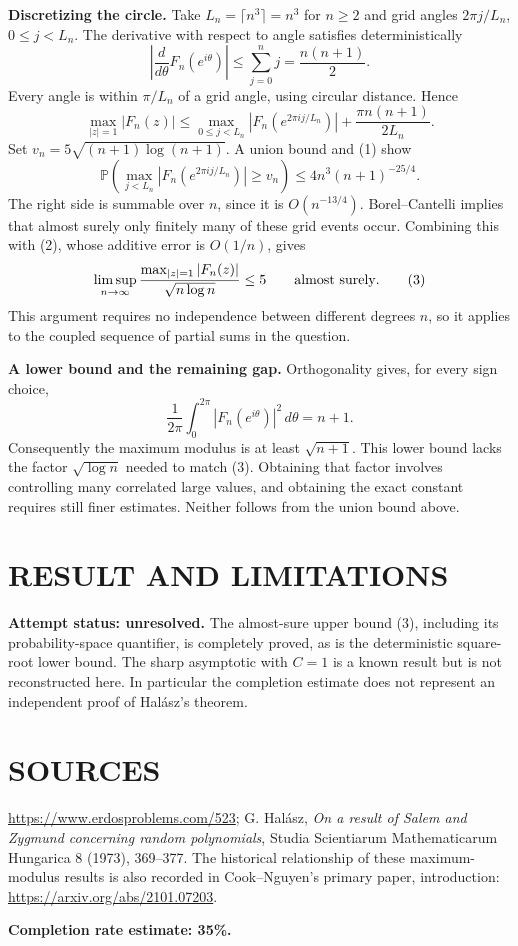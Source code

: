 \textbf{Discretizing the circle.} Take $L_n=\lceil n^3\rceil=n^3$ for $n\geq2$ and grid angles $2\pi j/L_n$, $0\leq j<L_n$. The derivative with respect to angle satisfies deterministically
\[
 \left|\frac d{d\theta}F_n(e^{i\theta})\right|
 \leq\sum_{j=0}^n j=\frac{n(n+1)}2.
\]
Every angle is within $\pi/L_n$ of a grid angle, using circular distance. Hence
\[
 \max_{|z|=1}|F_n(z)|
 \leq\max_{0\leq j<L_n}|F_n(e^{2\pi ij/L_n})|
          +\frac{\pi n(n+1)}{2L_n}.                  \tag{2}
\]
Set $v_n=5\sqrt{(n+1)\log(n+1)}$. A union bound and (1) show
\[
 \mathbb P\left(\max_{j<L_n}|F_n(e^{2\pi ij/L_n})|\geq v_n\right)
 \leq4n^3(n+1)^{-25/4}.
\]
The right side is summable over $n$, since it is $O(n^{-13/4})$. Borel--Cantelli implies that almost surely only finitely many of these grid events occur. Combining this with (2), whose additive error is $O(1/n)$, gives
\[
 \limsup_{n\to\infty}
 \frac{\max_{|z|=1}|F_n(z)|}{\sqrt{n\log n}}\leq5
 \qquad\hbox{almost surely}.                          \tag{3}
\]
This argument requires no independence between different degrees $n$, so it applies to the coupled sequence of partial sums in the question.

\textbf{A lower bound and the remaining gap.} Orthogonality gives, for every sign choice,
\[
 \frac1{2\pi}\int_0^{2\pi}|F_n(e^{i\theta})|^2\,d\theta=n+1.
\]
Consequently the maximum modulus is at least $\sqrt{n+1}$. This lower bound lacks the factor $\sqrt{\log n}$ needed to match (3). Obtaining that factor involves controlling many correlated large values, and obtaining the exact constant requires still finer estimates. Neither follows from the union bound above.

\section{RESULT AND LIMITATIONS}
\textbf{Attempt status: unresolved.} The almost-sure upper bound (3), including its probability-space quantifier, is completely proved, as is the deterministic square-root lower bound. The sharp asymptotic with $C=1$ is a known result but is not reconstructed here. In particular the completion estimate does not represent an independent proof of Hal\'asz's theorem.

\section{SOURCES}
\url{https://www.erdosproblems.com/523}; G. Hal\'asz, \emph{On a result of Salem and Zygmund concerning random polynomials}, Studia Scientiarum Mathematicarum Hungarica 8 (1973), 369--377. The historical relationship of these maximum-modulus results is also recorded in Cook--Nguyen's primary paper, introduction: \url{https://arxiv.org/abs/2101.07203}.

\textbf{Completion rate estimate: 35\%.}
